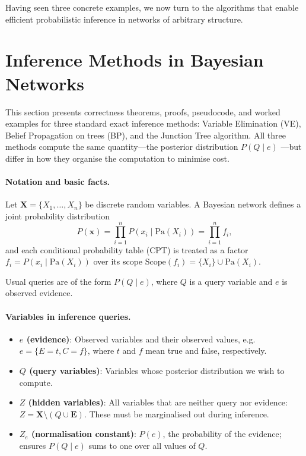 \FloatBarrier

\medskip
Having seen three concrete examples, we now turn to the algorithms that
enable efficient probabilistic inference in networks of arbitrary structure.
\section{Inference Methods in Bayesian Networks}\label{sec:inference}

This section presents correctness theorems, proofs, pseudocode, and worked
examples for three standard exact inference methods: Variable Elimination (VE),
Belief Propagation on trees (BP), and the Junction Tree algorithm. All three
methods compute the same quantity---the posterior distribution $P(Q\mid e)$
---but differ in how they organise the computation to minimise cost.

\paragraph{Notation and basic facts.}
Let $\mathbf{X}=\{X_1,\dots,X_n\}$ be discrete random variables. A Bayesian
network defines a joint probability distribution
\[
P(\mathbf{x})=\prod_{i=1}^n P(x_i \mid \mathrm{Pa}(X_i))=\prod_{i=1}^n f_i,
\]
and each conditional probability table (CPT) is treated as a factor
$f_i=P(x_i\mid\mathrm{Pa}(X_i))$ over its scope
$\mathrm{Scope}(f_i)=\{X_i\}\cup\mathrm{Pa}(X_i)$.

Usual queries are of the form $P(Q\mid e)$, where $Q$ is a query variable
and $e$ is observed evidence.

\paragraph{Variables in inference queries.}
\begin{itemize}
\item \textbf{$e$ (evidence)}: Observed variables and their observed values,
      e.g.\ $e=\{E=t,C=f\}$, where $t$ and $f$ mean true and false, respectively.
\item \textbf{$Q$ (query variables)}: Variables whose posterior distribution
      we wish to compute.
\item \textbf{$Z$ (hidden variables)}: All variables that are neither query
      nor evidence: $Z=\mathbf{X}\setminus(Q\cup\mathbf{E})$.
      These must be marginalised out during inference.
\item \textbf{$Z_e$ (normalisation constant)}: $P(e)$, the probability of
      the evidence; ensures $P(Q\mid e)$ sums to one over all values of $Q$.
\end{itemize}

